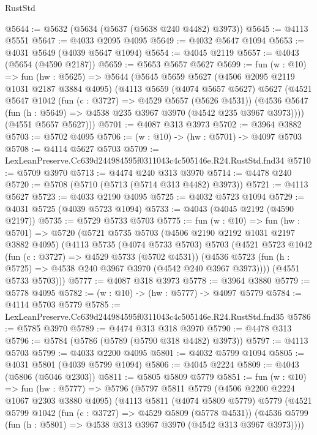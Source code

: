 \begin{lexlean}{RustStd}
\begin{coremodule}
@5644 := @5632 (@5634 (@5637 (@5638 @240 @4482) @3973))
@5645 := @4113 @5551
@5647 := @4033 @2095 @4095
@5649 := @4032 @5647 @1094
@5653 := @4031 @5649 (@4039 @5647 @1094)
@5654 := @4045 @2119
@5657 := @4043 (@5654 (@4590 @2187))
@5659 := @5653 @5657 @5627
@5699 := fun (w : @10) =>
  fun (hw : @5625) =>
  @5644
    (@5645
      @5659
      @5627
      (@4506 @2095 @2119 @1031 @2187 @3884 @4095)
      (@4113
        @5659
        (@4074 @5657 @5627)
        @5627
        (@4521
          @5647
          @1042
          (fun (c : @3727) => @4529 @5657 (@5626 @4531))
          (@4536 @5647 (fun (h : @5649) => @4538 @235 @3967 @3970 (@4542 @235 @3967 @3973))))
        (@4551 @5657 @5627)))
@5701 := @4087 @313 @3973
@5702 := @3964 @3882
@5703 := @5702 @4095
@5706 := (w : @10) -> (hw : @5701) -> @4097 @5703
@5708 := @4114 @5627 @5703
@5709 := LexLeanPreserve.Cc639d244984595f0311043c4c505146e.R24.RustStd.fnd34
@5710 := @5709 @3970
@5713 := @4474 @240 @313 @3970
@5714 := @4478 @240
@5720 := @5708 (@5710 (@5713 (@5714 @313 @4482) @3973))
@5721 := @4113 @5627
@5723 := @4033 @2190 @4095
@5725 := @4032 @5723 @1094
@5729 := @4031 @5725 (@4039 @5723 @1094)
@5733 := @4043 (@4045 @2192 (@4590 @2197))
@5735 := @5729 @5733 @5703
@5775 := fun (w : @10) =>
  fun (hw : @5701) =>
  @5720
    (@5721
      @5735
      @5703
      (@4506 @2190 @2192 @1031 @2197 @3882 @4095)
      (@4113
        @5735
        (@4074 @5733 @5703)
        @5703
        (@4521
          @5723
          @1042
          (fun (c : @3727) => @4529 @5733 (@5702 @4531))
          (@4536 @5723 (fun (h : @5725) => @4538 @240 @3967 @3970 (@4542 @240 @3967 @3973))))
        (@4551 @5733 @5703)))
@5777 := @4087 @318 @3973
@5778 := @3964 @3880
@5779 := @5778 @4095
@5782 := (w : @10) -> (hw : @5777) -> @4097 @5779
@5784 := @4114 @5703 @5779
@5785 := LexLeanPreserve.Cc639d244984595f0311043c4c505146e.R24.RustStd.fnd35
@5786 := @5785 @3970
@5789 := @4474 @313 @318 @3970
@5790 := @4478 @313
@5796 := @5784 (@5786 (@5789 (@5790 @318 @4482) @3973))
@5797 := @4113 @5703
@5799 := @4033 @2200 @4095
@5801 := @4032 @5799 @1094
@5805 := @4031 @5801 (@4039 @5799 @1094)
@5806 := @4045 @2224
@5809 := @4043 (@5806 (@5046 @2303))
@5811 := @5805 @5809 @5779
@5851 := fun (w : @10) =>
  fun (hw : @5777) =>
  @5796
    (@5797
      @5811
      @5779
      (@4506 @2200 @2224 @1067 @2303 @3880 @4095)
      (@4113
        @5811
        (@4074 @5809 @5779)
        @5779
        (@4521
          @5799
          @1042
          (fun (c : @3727) => @4529 @5809 (@5778 @4531))
          (@4536 @5799 (fun (h : @5801) => @4538 @313 @3967 @3970 (@4542 @313 @3967 @3973))))

\end{coremodule}
\end{lexlean}
